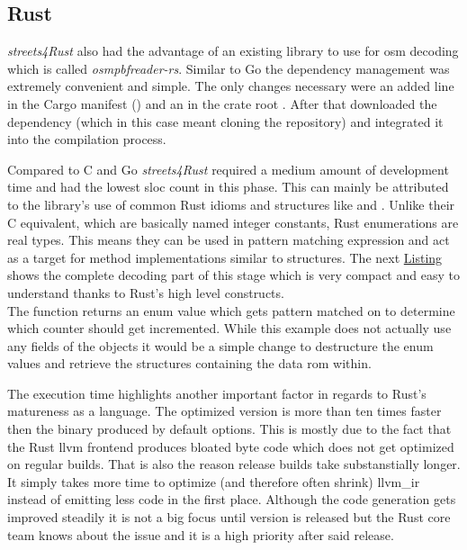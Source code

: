 \subsection{Rust}
\label{subsec:Implementation::Counting::Rust}

\textit{streets4Rust} also had the advantage of an existing library to use for \gls{osm} decoding which is called \textit{osmpbfreader-rs}. Similar to Go the dependency management was extremely convenient and simple. The only changes necessary were an added line in the Cargo manifest () and an  in the crate root . After that  downloaded the dependency (which in this case meant cloning the  repository) and integrated it into the compilation process.

Compared to C and Go \textit{streets4Rust} required a medium amount of development time and had the lowest \gls{sloc} count in this phase. This can mainly be attributed to the library's use of common Rust idioms and structures like  and . Unlike their C equivalent, which are basically named integer constants, Rust enumerations are real types. This means they can be used in pattern matching expression and act as a target for method implementations similar to structures. The next \hyperref[lst:osm_decoding.rs]{Listing} shows the complete decoding part of this stage which is very compact and easy to understand thanks to Rust's high level constructs.
\\


The function  returns an enum value which gets pattern matched on to determine which counter should get incremented. While this example does not actually use any fields of the objects it would be a simple change to destructure the enum values and retrieve the structures containing the data rom within.

The execution time highlights another important factor in regards to Rust's matureness as a language. The optimized version is more than ten times faster then the binary produced by default options. This is mostly due to the fact that the Rust \gls{llvm} frontend produces bloated byte code which does not get optimized on regular builds. That is also the reason release builds take substanstially longer. It simply takes more time to optimize (and therefore often shrink) \gls{llvm_ir} instead of emitting less code in the first place. Although the code generation gets improved steadily it is not a big focus until version  is released but the Rust core team knows about the issue and it is a high priority after said release.

